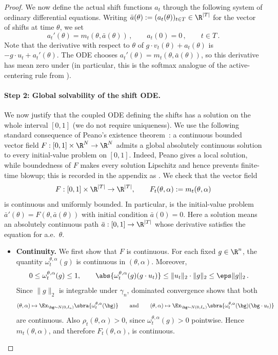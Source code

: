 \documentclass[11pt]{article}
\begin{document}
\begin{proof}
	We now define the actual shift functions $a_t$ through the following system of ordinary differential equations.
	Writing $\bar a(\theta):=(a_t(\theta))_{t\in T}\in\R^{|T|}$ for the vector of shifts at time $\theta$, we set 
	\begin{equation} \label{eq:intercept-ode}
		a_t'(\theta)=m_t(\theta,\bar{a}(\theta))\,,
		\qquad
		a_t(0)=0\,,
		\qquad 
		t \in T\,. 
	\end{equation}
	Note that the derivative with respect to $\theta$ of $g\cdot v_t(\theta)+a_t(\theta)$ is $-g\cdot u_t+a_t'(\theta)$.
	The ODE chooses $a_t'(\theta)=m_t(\theta,\bar{a}(\theta))$, so this derivative has mean zero under  (in particular, this is the softmax analogue of the active-centering rule from ). 

	
	\paragraph{Step 2: Global solvability of the shift ODE.}
	
	We now justify that the coupled ODE defining the shifts has a solution on the whole interval $[0,1]$ (we do not require uniqueness). 
	We use the following standard consequence of Peano's existence theorem~\cite[Theorem 2.19]{Tes12}: a continuous bounded vector field $F:[0,1]\times\R^N \to \R^N$ admits a global absolutely continuous solution to every initial-value problem on $[0,1]$. 
	Indeed, Peano gives a local solution, while boundedness of $F$ makes every solution Lipschitz and hence prevents finite-time blowup; this is recorded in the appendix as .
	We check that the vector field 
	\[
		F:[0,1]\times\R^{|T|}\to\R^{|T|},
		\qquad
		F_t(\theta,\alpha)
		:=
		m_t(\theta,\alpha)
	\]
	is continuous and uniformly bounded.
	In particular,  is the initial-value problem $\bar{a}'(\theta)=F(\theta,\bar{a}(\theta))$ with initial condition $\bar{a}(0)=0$.
	Here a solution means an absolutely continuous path $\bar{a}:[0,1]\to\R^{|T|}$ whose derivative satisfies the equation for a.e.~$\theta$. 
	
	\begin{itemize}
		\item \textbf{Continuity.}  
		We first show that $F$ is continuous.
		For each fixed $g \in \R^n$, the quantity $\omega_t^{\theta,\alpha}(g)$ is continuous in $(\theta,\alpha)$.
		Moreover,
		\[
			0\leq \omega_t^{\theta,\alpha}(g)\leq 1,
			\qquad
			\abs{\omega_t^{\theta,\alpha}(g)(g\cdot u_t)}
			\leq
			\|u_t\|_2\cdot\|g\|_2
			\leq
			\eps\|g\|_2\,.
		\]
		Since $\|g\|_2$ is integrable under $\gamma_n$, dominated convergence shows that both
		\[
			(\theta,\alpha)
			\mapsto
			\Ex_{\bg\sim N(0,I_n)}\sbra{\omega_t^{\theta,\alpha}(\bg)}
			\qquad\text{and}\qquad 
			(\theta,\alpha)
			\mapsto
			\Ex_{\bg\sim N(0,I_n)}\sbra{\omega_t^{\theta,\alpha}(\bg)(\bg\cdot u_t)}
		\]
		are continuous.
		Also $\rho_t(\theta,\alpha)>0$, since $\omega_t^{\theta,\alpha}(g)>0$ pointwise.
		Hence $m_t(\theta,\alpha)$, and therefore $F_t(\theta,\alpha)$, is continuous.


\end{itemize}
\end{proof}
\end{document}
